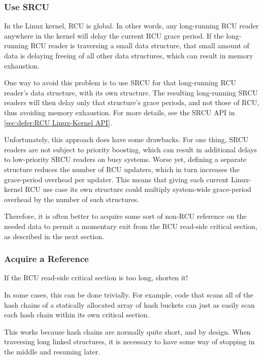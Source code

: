 \subsubsection{Use SRCU}
\label{sec:together:Use SRCU}

In the Linux kernel, RCU is global.
In other words, any long-running RCU reader anywhere in the kernel will
delay the current RCU grace period.
If the long-running RCU reader is traversing a small data structure,
that small amount of data is delaying freeing of all other data structures,
which can result in memory exhaustion.

One way to avoid this problem is to use SRCU for that long-running RCU
reader's data structure, with its own  structure.
The resulting long-running SRCU readers will then delay only that
 structure's grace periods, and not those of RCU,
thus avoiding memory exhaustion.
For more details, see the SRCU API in \cref{sec:defer:RCU Linux-Kernel API}.

Unfortunately, this approach does have some drawbacks.
For one thing, SRCU readers are not subject to priority boosting, which can
result in additional delays to low-priority SRCU readers on busy
systems.
Worse yet, defining a separate  structure reduces the
number of RCU updaters, which in turn increases the grace-period
overhead per updater.
This means that giving each current Linux-kernel RCU use case its own
 structure could multiply system-wide grace-period
overhead by the number of such structures.

Therefore, it is often better to acquire some sort of non-RCU reference
on the needed data to permit a momentary exit from the RCU read-side
critical section, as described in the next section.

\subsubsection{Acquire a Reference}
\label{sec:together:Acquire a Reference}

If the RCU read-side critical section is too long, shorten it!

In some cases, this can be done trivially.
For example, code that scans all of the hash chains of a statically
allocated array of hash buckets can just as easily scan each hash chain
within its own critical section.

This works because hash chains are normally quite short, and by design.
When traversing long linked structures, it is necessary to have some
way of stopping in the middle and resuming later.

